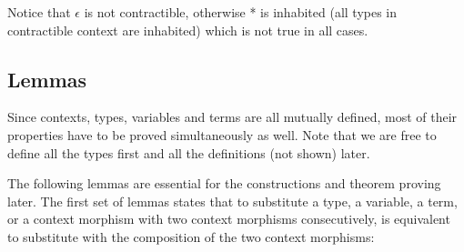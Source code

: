 \begin{code}\>\<%
\\
\>  \<%
\\
\>[0]\<[2]%
\>[2] \<[7]%
\>[7]\AgdaSymbol{:}  \AgdaSymbol{(} \AgdaInductiveConstructor{,} \AgdaInductiveConstructor{*}\AgdaSymbol{)}\<%
\\
\>[0]\<[2]%
\>[2] \<[7]%
\>[7]\AgdaSymbol{:} \AgdaSymbol{\}}     \AgdaSymbol{\{} \AgdaSymbol{:}  \AgdaSymbol{\}(} \AgdaSymbol{:}  \AgdaSymbol{)} \<[50]%
\>[50]\<%
\\
\>[2]\<[7]%
\>[7]  \AgdaSymbol{(} \AgdaInductiveConstructor{,}  \AgdaInductiveConstructor{,} \AgdaSymbol{(} \AgdaSymbol{(} \AgdaSymbol{)}   \AgdaSymbol{))} \<[54]%
\>[54]\<%
\\
\>\<\end{code}

Notice that $\epsilon$ is not contractible, otherwise * is inhabited (all types in contractible context are inhabited) which is not true in all cases. 

\subsection{Lemmas}

Since contexts, types, variables and
terms are all mutually defined, most of their properties have to
be proved simultaneously as well. Note that we are free to define all the
types first and all the definitions (not shown) later. 

The following lemmas are essential for the constructions and theorem
proving later.  The first set of lemmas states that to substitute a
type, a variable, a term, or a context morphism with two context
morphisms consecutively, is equivalent to substitute with the
composition of the two context morphisms:

